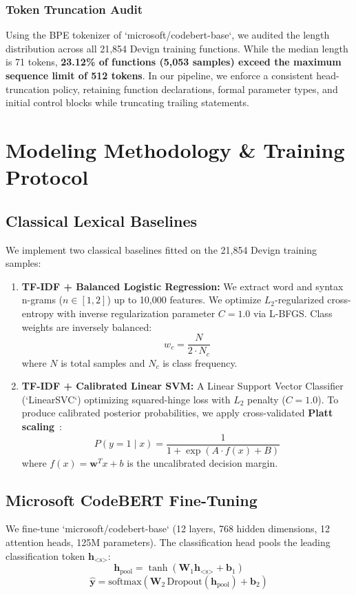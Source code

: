 \documentclass[conference]{IEEEtran}
\begin{document}
\subsubsection{Token Truncation Audit}
Using the BPE tokenizer of `microsoft/codebert-base`, we audited the length distribution across all 21,854 Devign training functions. While the median length is 71 tokens, \textbf{23.12\% of functions (5,053 samples) exceed the maximum sequence limit of 512 tokens}. In our pipeline, we enforce a consistent head-truncation policy, retaining function declarations, formal parameter types, and initial control blocks while truncating trailing statements.

\section{Modeling Methodology \& Training Protocol}

\subsection{Classical Lexical Baselines}
We implement two classical baselines fitted on the 21,854 Devign training samples:
\begin{enumerate}
    \item \textbf{TF-IDF + Balanced Logistic Regression:} We extract word and syntax n-grams ($n \in [1, 2]$) up to 10,000 features. We optimize $L_2$-regularized cross-entropy with inverse regularization parameter $C=1.0$ via L-BFGS. Class weights are inversely balanced:
    \begin{equation}
    w_c = \frac{N}{2 \cdot N_c}
    \end{equation}
    where $N$ is total samples and $N_c$ is class frequency.
    \item \textbf{TF-IDF + Calibrated Linear SVM:} A Linear Support Vector Classifier (`LinearSVC`) optimizing squared-hinge loss with $L_2$ penalty ($C=1.0$). To produce calibrated posterior probabilities, we apply cross-validated \textbf{Platt scaling}~\cite{platt1999probabilistic}:
    \begin{equation}
    P(y=1 \mid x) = \frac{1}{1 + \exp\left(A \cdot f(x) + B\right)}
    \end{equation}
    where $f(x) = \mathbf{w}^T x + b$ is the uncalibrated decision margin.
\end{enumerate}

\subsection{Microsoft CodeBERT Fine-Tuning}
We fine-tune `microsoft/codebert-base` (12 layers, 768 hidden dimensions, 12 attention heads, 125M parameters). The classification head pools the leading classification token $\mathbf{h}_{\text{<s>}}$:
\begin{equation}
\mathbf{h}_{\text{pool}} = \tanh(\mathbf{W}_1 \mathbf{h}_{\text{<s>}} + \mathbf{b}_1)
\end{equation}
\begin{equation}
\hat{\mathbf{y}} = \text{softmax}(\mathbf{W}_2 \, \text{Dropout}(\mathbf{h}_{\text{pool}}) + \mathbf{b}_2)
\end{equation}
\end{document}
